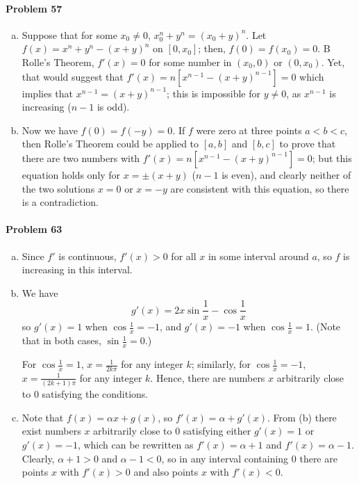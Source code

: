 \documentclass{article}
\begin{document}
\paragraph{Problem 57}
\begin{enumerate}[(a)]
  \item Suppose that for some $x_0 \neq 0$, $x_0^n + y^n = (x_0 + y)^n$. Let
    $f(x) = x^n + y^n - (x+y)^n$ on $[0, x_0]$; then, $f(0) = f(x_0) = 0$. B
    Rolle's Theorem, $f'(x) = 0$ for some number in $(x_0, 0)$ or $(0, x_0)$.
    Yet, that would suggest that $f'(x) = n[x^{n-1} - (x+y)^{n-1}] = 0$ which
    implies that $x^{n-1} = (x+y)^{n-1}$; this is impossible for $y \neq 0$, as
    $x^{n-1}$ is increasing ($n-1$ is odd).
  \item Now we have $f(0) = f(-y) = 0$. If $f$ were zero at three points $a < b
    < c$, then Rolle's Theorem could be applied to $[a, b]$ and $[b, c]$ to
    prove that there are two numbers with $f'(x) = n[x^{n-1} - (x+y)^{n-1}] =
    0$; but this equation holds only for $x = \pm(x + y)$ ($n-1$ is even), and
    clearly neither of the two solutions $x = 0$ or $x = -y$ are consistent
    with this equation, so there is a contradiction.
\end{enumerate}

\paragraph{Problem 63}
\begin{enumerate}[(a)]
  \item Since $f'$ is continuous, $f'(x) > 0$ for all $x$ in some interval
    around $a$, so $f$ is increasing in this interval.
  \item We have \[
      g'(x) = 2x \sin \frac{1}{x} - \cos \frac{1}{x}
    \] so $g'(x) = 1$ when $\cos \frac{1}{x} = -1$, and $g'(x) = -1$ when
    $\cos \frac{1}{x} = 1$. (Note that in both cases, $\sin \frac{1}{x} = 0$.)

    For $\cos \frac{1}{x} = 1$, $x = \frac{1}{2k\pi}$ for any integer $k$;
    similarly, for $\cos \frac{1}{x} = -1$, $x = \frac{1}{(2k + 1)\pi}$ for any
    integer $k$. Hence, there are numbers $x$ arbitrarily close to 0 satisfying
    the conditions.
  \item Note that $f(x) = \alpha x + g(x)$, so $f'(x) = \alpha + g'(x)$. From
    (b) there exist numbers $x$ arbitrarily close to 0 satisfying either $g'(x)
    = 1$ or $g'(x) = -1$, which can be rewritten as $f'(x) = \alpha + 1$ and
    $f'(x) = \alpha - 1$. Clearly, $\alpha + 1 > 0$ and $\alpha - 1 < 0$, so in
    any interval containing 0 there are points $x$ with $f'(x) > 0$ and also
    points $x$ with $f'(x) < 0$.
\end{enumerate}
\end{document}
